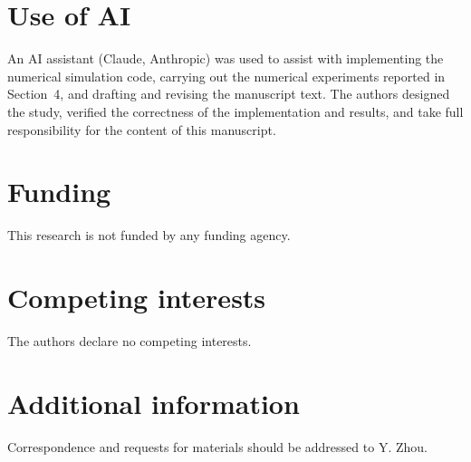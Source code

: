 \documentclass[fleqn,10pt]{wlscirep}
\begin{document}
\section*{Use of AI}
An AI assistant (Claude, Anthropic) was used to assist with implementing the numerical simulation code, carrying out the numerical experiments reported in Section~4, and drafting and revising the manuscript text. The authors designed the study, verified the correctness of the implementation and results, and take full responsibility for the content of this manuscript.

\section*{Funding}
This research is not funded by any funding agency.

\section*{Competing interests}
The authors declare no competing interests.

\section*{Additional information}
Correspondence and requests for materials should be addressed to Y. Zhou.
\end{document}
